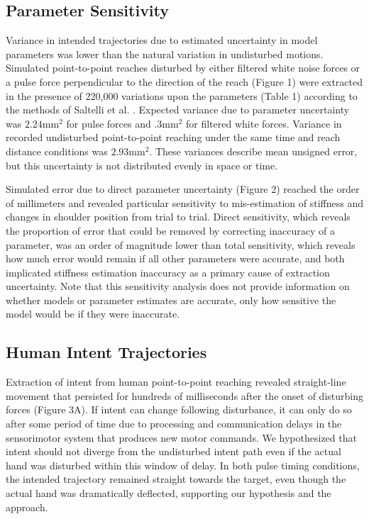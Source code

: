 \subsection*{Parameter Sensitivity}
Variance in intended trajectories due to estimated uncertainty in model parameters was lower than the natural variation in undisturbed motions. Simulated point-to-point reaches disturbed by either filtered white noise forces or a pulse force perpendicular to the direction of the reach (Figure 1) were extracted in the presence of 220,000 variations upon the parameters (Table 1) according to the methods of Saltelli et al. \cite{saltelli2010variance}. Expected variance due to parameter uncertainty was $2.24 \mathrm{mm}^2$ for pulse forces and $.3 \mathrm{mm}^2$ for filtered white forces. Variance in recorded undisturbed point-to-point reaching under the same time and reach distance conditions was $2.93 \mathrm{mm}^2$. These variances describe mean unsigned error, but this uncertainty is not distributed evenly in space or time.

Simulated error due to direct parameter uncertainty (Figure 2) reached the order of millimeters and revealed particular sensitivity to mis-estimation of stiffness and changes in shoulder position from trial to trial. Direct sensitivity, which reveals the proportion of error that could be removed by correcting inaccuracy of a parameter, was an order of magnitude lower than total sensitivity, which reveals how much error would remain if all other parameters were accurate, and both implicated stiffness estimation inaccuracy as a primary cause of extraction uncertainty. Note that this sensitivity analysis does not provide information on whether models or parameter estimates are accurate, only how sensitive the model would be if they were inaccurate. 

\subsection*{Human Intent Trajectories}
Extraction of intent from human point-to-point reaching revealed straight-line movement that persisted for hundreds of milliseconds after the onset of disturbing forces (Figure 3A). If intent can change following disturbance, it can only do so after some period of time due to processing and communication delays in the sensorimotor system that produces new motor commands. We hypothesized that intent should not diverge from the undisturbed intent path even if the actual hand was disturbed within this window of delay. In both pulse timing conditions, the intended trajectory remained straight towards the target, even though the actual hand was dramatically deflected, supporting our hypothesis and the approach. 

